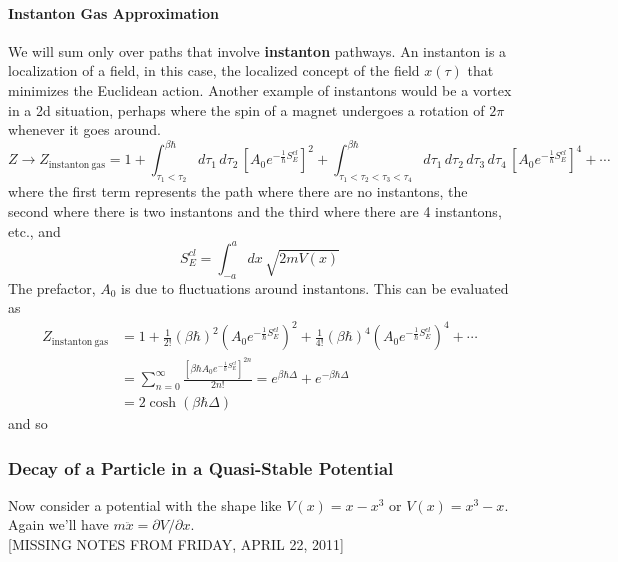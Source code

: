 \documentclass{article}
\begin{document}
	\paragraph{Instanton Gas Approximation} We will sum only over paths that involve \textbf{instanton} pathways. An instanton is a localization of a field, in this case, the localized concept of the field $x(\tau)$ that minimizes the Euclidean action. Another example of instantons would be a vortex in a 2d situation, perhaps where the spin of a magnet undergoes a rotation of $2\pi$ whenever it goes around. 
	\begin{equation}\label{instantonGas}Z\longrightarrow Z_{\mathrm{instanton}\ \mathrm{gas}}=1+\int_{\tau_1<\tau_2}^{\beta\hbar}d\tau_1\,d\tau_2\,\left[A_0e^{-\frac{1}{\hbar}S_E^{cl}}\right]^2+\int_{\tau_1<\tau_2<\tau_3<\tau_4}^{\beta\hbar} d\tau_1\,d\tau_2\,d\tau_3\,d\tau_4\,\left[A_0e^{-\frac{1}{\hbar}S_E^{cl}}\right]^4+\cdots\end{equation}
	where the first term represents the path where there are no instantons, the second where there is two instantons and the third where there are 4 instantons, etc., and
	$$S_{E}^{cl}=\int_{-a}^a dx\,\sqrt{2mV(x)}$$
	The prefactor, $A_0$ is due to fluctuations around instantons. This can be evaluated as
	\begin{align*}
	Z_{\mathrm{instanton}\ \mathrm{gas}}&=1+\frac{1}{2!}(\beta\hbar)^2\left(A_0e^{-\frac{1}{\hbar}S_E^{cl}}\right)^2+\frac{1}{4!}(\beta\hbar)^4\left(A_0e^{-\frac{1}{\hbar}S_E^{cl}}\right)^4+\cdots\\
	&=\sum_{n=0}^\infty \frac{\left[\beta\hbar A_0e^{-\frac{1}{\hbar}S_E^{cl}}\right]^{2n}}{2n!}=e^{\beta\hbar\Delta}+e^{-\beta\hbar\Delta}\\
	&=2\cosh(\beta\hbar\Delta)
	\end{align*}
	and so
	\begin{center}
	\end{center}
	\subsubsection{Decay of a Particle in a Quasi-Stable Potential}
	
	Now consider a potential with the shape like $V(x)=x-x^3$ or $V(x)=x^3-x$. Again we'll have $m\ddot{x}=\partial V/\partial x$.\\
	
	[MISSING NOTES FROM FRIDAY, APRIL 22, 2011]\\
	
\end{document}
